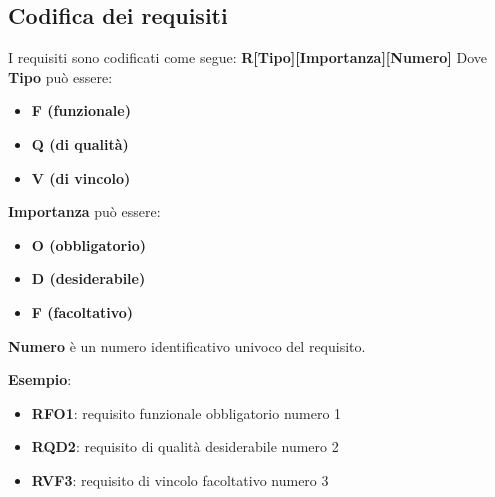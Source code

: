 \subsection{Codifica dei requisiti}
I requisiti sono codificati come segue: \textbf{R[Tipo][Importanza][Numero]}
\newline
Dove \textbf{Tipo} può essere:
\begin{itemize}
	\item \textbf{F (funzionale)}
	\item \textbf{Q (di qualità)}
	\item \textbf{V (di vincolo)}
\end{itemize}
\textbf{Importanza} può essere:
\begin{itemize}
	\item \textbf{O (obbligatorio)}
	\item \textbf{D (desiderabile)}
	\item \textbf{F (facoltativo)}
\end{itemize}
\textbf{Numero} è un numero identificativo univoco del requisito.

\textbf{Esempio}:
\begin{itemize}
	\item \textbf{RFO1}: requisito funzionale obbligatorio numero 1
	\item \textbf{RQD2}: requisito di qualità desiderabile numero 2
	\item \textbf{RVF3}: requisito di vincolo facoltativo numero 3
\end{itemize}

\pagebreak
